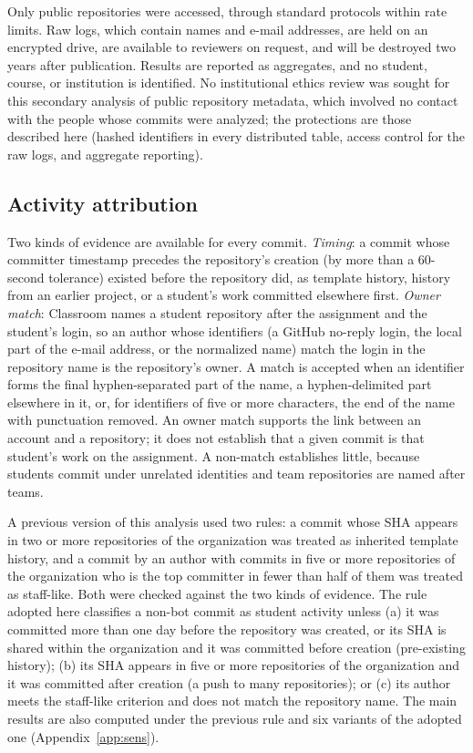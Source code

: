 \documentclass[acmsmall,screen,review,anonymous]{acmart}
\begin{document}
Only public repositories were accessed, through standard protocols within rate limits. Raw logs, which contain names and e-mail addresses, are held on an encrypted drive, are available to reviewers on request, and will be destroyed two years after publication. Results are reported as aggregates, and no student, course, or institution is identified. No institutional ethics review was sought for this secondary analysis of public repository metadata, which involved no contact with the people whose commits were analyzed; the protections are those described here (hashed identifiers in every distributed table, access control for the raw logs, and aggregate reporting).

\subsection{Activity attribution}
\label{sec:attribution}

Two kinds of evidence are available for every commit. \textit{Timing}: a commit whose committer timestamp precedes the repository's creation (by more than a 60-second tolerance) existed before the repository did, as template history, history from an earlier project, or a student's work committed elsewhere first. \textit{Owner match}: Classroom names a student repository after the assignment and the student's login, so an author whose identifiers (a GitHub no-reply login, the local part of the e-mail address, or the normalized name) match the login in the repository name is the repository's owner. A match is accepted when an identifier forms the final hyphen-separated part of the name, a hyphen-delimited part elsewhere in it, or, for identifiers of five or more characters, the end of the name with punctuation removed. An owner match supports the link between an account and a repository; it does not establish that a given commit is that student's work on the assignment. A non-match establishes little, because students commit under unrelated identities and team repositories are named after teams.

A previous version of this analysis used two rules: a commit whose SHA appears in two or more repositories of the organization was treated as inherited template history, and a commit by an author with commits in five or more repositories of the organization who is the top committer in fewer than half of them was treated as staff-like. Both were checked against the two kinds of evidence. The rule adopted here classifies a non-bot commit as student activity unless (a) it was committed more than one day before the repository was created, or its SHA is shared within the organization and it was committed before creation (pre-existing history); (b) its SHA appears in five or more repositories of the organization and it was committed after creation (a push to many repositories); or (c) its author meets the staff-like criterion and does not match the repository name. The main results are also computed under the previous rule and six variants of the adopted one (Appendix~\ref{app:sens}).
\end{document}
